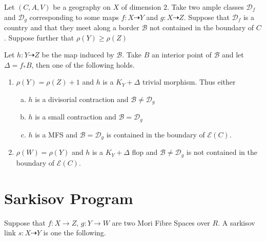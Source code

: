 	
	\begin{lemma}\cite[Lemma 3.5]{hacon2009sarkisov}\label{links}
		Let $(C,A,V)$ be a geography on $X$ of dimension $2$. Take two ample classes $\mathcal{D}_{f}$ and $\mathcal{D}_{g}$ corresponding to some maps $f:X \dashrightarrow Y$ and $g: X\dashrightarrow Z$. Suppose that $\mathcal{D}_{f}$ is a country and that they meet along a border $\mathcal{B}$ not contained in the boundary of $C$. Suppose further that $\rho(Y) \geq \rho(Z)$
		
		Let $h: Y \dashrightarrow Z$ be the map induced by $\mathcal{B}$. Take $B$ an interior point of $\mathcal{B}$ and let $\Delta=f_{*}B$, then one of the following holds.
			\begin{enumerate}
			\item $\rho(Y)=\rho(Z)+1$ and $h$ is a $K_{Y}+\Delta$ trivial morphism. Thus either
			\begin{enumerate}[a)]
				\item $h$ is a divisorial contraction and $\mathcal{B} \neq \mathcal{D}_{g}$
				\item $h$ is a small contraction and $\mathcal{B}=\mathcal{D}_{g}$
				\item $h$ is a MFS and $\mathcal{B}=\mathcal{D}_{g}$ is contained in the boundary of $\mathcal{E}(C)$.
			\end{enumerate}
			\item $\rho(W)=\rho(Y)$ and $h$ is a $K_{Y}+\Delta$ flop and $\mathcal{B} \neq \mathcal{D}_{g}$ is not contained in the boundary of $\mathcal{E}(C)$.
		\end{enumerate}
	\end{lemma}
	
	

\section{Sarkisov Program} \label{Sarkisov-section}


Suppose that $f:X \to Z$, $g:Y \to W$ are two Mori Fibre Spaces over $R$. A sarkisov link $s:X \dashrightarrow Y$ is one the following.

